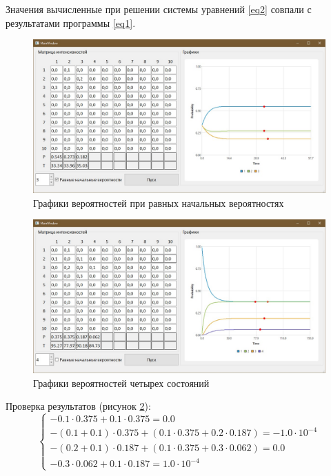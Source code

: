 Значения вычисленные при решении системы уравнений \ref{eq2} совпали с результатами программы \ref{eq1}.

\begin{figure}[h]
	\includegraphics[width=1\linewidth]{inc/img/g2}
	\caption{Графики вероятностей при равных начальных вероятностях}
	\label{g2}
\end{figure}

\newpage
\begin{figure}[h]
	\includegraphics[width=1\linewidth]{inc/img/g3}
	\caption{Графики вероятностей четырех состояний}
	\label{g3}
\end{figure}

Проверка результатов (рисунок \ref{g3}):
\begin{equation}
	\left\{\begin{array}{l}
		-0.1\cdot0.375 + 0.1 \cdot 0.375 = 0.0 \\
		-(0.1+0.1)\cdot0.375 + (0.1\cdot0.375 + 0.2\cdot0.187) = -1.0\cdot10^{-4} \\
		-(0.2+0.1)\cdot0.187 + (0.1\cdot0.375 + 0.3\cdot0.062) = 0.0 \\
		-0.3\cdot0.062 + 0.1\cdot0.187 = 1.0\cdot10^{-4}
	\end{array}\right.
\end{equation}


